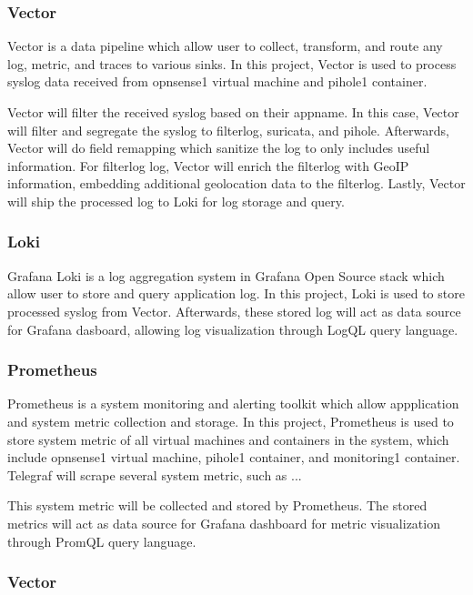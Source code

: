 \documentclass[../index.tex]{subfiles}
\begin{document}
\subsubsection{Vector}

Vector is a data pipeline which allow user to collect, transform, and route any log, metric, and
traces to various sinks. In this project, Vector is used to process syslog data received from
opnsense1 virtual machine and pihole1 container.

Vector will filter the received syslog based on their appname. In this case, Vector will filter and
segregate the syslog to filterlog, suricata, and pihole. Afterwards, Vector will do field remapping
which sanitize the log to only includes useful information. For filterlog log, Vector will enrich
the filterlog with GeoIP information, embedding additional geolocation data to the filterlog.
Lastly, Vector will ship the processed log to Loki for log storage
and query.

\subsubsection{Loki}

Grafana Loki is a log aggregation system in Grafana Open Source stack which allow user to store and
query application log. In this project, Loki is used to store processed syslog from Vector.
Afterwards, these stored log will act as data source for Grafana dasboard, allowing log
visualization through LogQL query language.

\subsubsection{Prometheus}

Prometheus is a system monitoring and alerting toolkit which allow appplication and system metric
collection and storage. In this project, Prometheus is used to store system metric of all virtual
machines and containers in the system, which include opnsense1 virtual machine, pihole1 container,
and monitoring1 container. Telegraf will scrape several system metric, such as ...

This system metric  will be collected and stored by Prometheus. The stored metrics will act as data
source for Grafana dashboard for metric visualization through PromQL query language.

\subsubsection{Vector}

\end{document}
